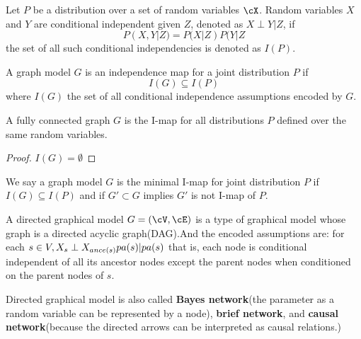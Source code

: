 \begin{refsection}
\begin{definition}
	\cite[60]{koller2009probabilistic}\cite[324]{murphy2012machine}Let $P$ be a distribution over a set of random variables $\cX$. Random variables $X$ and $Y$ are conditional independent given $Z$, denoted as $X\perp Y | Z$, if
	$$P(X,Y|Z) = P(X|Z)P(Y|Z$$
	the set of all such conditional independencies is denoted as $I(P)$.
\end{definition}

\begin{definition}
	\cite[60]{koller2009probabilistic}\cite[324]{murphy2012machine} A graph model $G$ is an independence map for a joint distribution $P$ if $$I(G)\subseteq I(P)$$
	where $I(G)$ the set of all conditional independence assumptions encoded by $G$.
\end{definition}

\begin{lemma}
	A fully connected graph $G$ is the I-map for all distributions $P$ defined over the same random variables. 
\end{lemma}
\begin{proof}
	$I(G) = \emptyset$
\end{proof}


\begin{definition}
	We say a graph model $G$ is the minimal I-map for joint distribution $P$ if $I(G)\subseteq I(P)$ and if $G'\subset G$ implies $G'$ is not I-map of $P$.
\end{definition}


\begin{definition}
	\cite[309]{murphy2012machine}
	A directed graphical model $G=(\cV,\cE)$ is a type of graphical model whose graph is a directed acyclic graph(DAG).And the encoded assumptions are: for each $s\in V, X_s \perp X_{ance(s)}\\pa(s)|pa(s)$
	that is, each node is conditional independent of all its ancestor nodes except the parent nodes when conditioned on the parent nodes of $s$.
\end{definition}

\begin{remark}
	Directed graphical model is also called \textbf{Bayes network}(the parameter as a random variable can be represented by a node), \textbf{brief network}, and \textbf{causal network}(because the directed arrows can be interpreted as causal relations.)
\end{remark}



\end{refsection}
